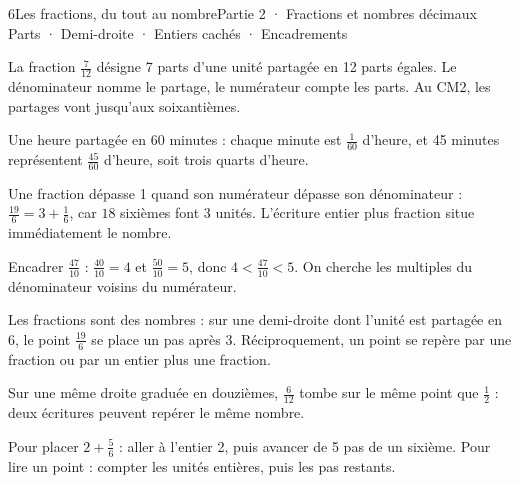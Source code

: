 \begin{ouverture}[calcul]{6}{Les fractions, du tout au nombre}{Partie 2 · Fractions et nombres décimaux}
{Parts · Demi-droite · Entiers cachés · Encadrements}
\end{ouverture}
\pagestyle{otMain}\essentiel\fontsize{11}{15}\selectfont
{}\label{cours-6-1}
\begin{definition}La fraction $\frac{7}{12}$ désigne 7 parts d’une unité partagée en 12 parts égales. Le dénominateur nomme le partage, le numérateur compte les parts. Au CM2, les partages vont jusqu’aux soixantièmes.\end{definition}
\begin{exemple}Une heure partagée en 60 minutes : chaque minute est $\frac1{60}$ d’heure, et 45 minutes représentent $\frac{45}{60}$ d’heure, soit trois quarts d’heure.\end{exemple}
\begin{propriete}Une fraction dépasse 1 quand son numérateur dépasse son dénominateur : $\frac{19}6=3+\frac16$, car $18$ sixièmes font 3 unités. L’écriture entier plus fraction situe immédiatement le nombre.\end{propriete}
\begin{savoirfaire}Encadrer $\frac{47}{10}$ : $\frac{40}{10}=4$ et $\frac{50}{10}=5$, donc $4<\frac{47}{10}<5$. On cherche les multiples du dénominateur voisins du numérateur.\end{savoirfaire}
\clearpage
{}\label{cours-6-2}
\begin{propriete}Les fractions sont des nombres : sur une demi-droite dont l’unité est partagée en 6, le point $\frac{19}6$ se place un pas après 3. Réciproquement, un point se repère par une fraction ou par un entier plus une fraction.\end{propriete}
\label{fig-cours-6-2-cours-droite-sixiemes}

\begin{exemple}Sur une même droite graduée en douzièmes, $\frac6{12}$ tombe sur le même point que $\frac12$ : deux écritures peuvent repérer le même nombre.\end{exemple}
\begin{savoirfaire}Pour placer $2+\frac56$ : aller à l’entier 2, puis avancer de 5 pas de un sixième. Pour lire un point : compter les unités entières, puis les pas restants.\end{savoirfaire}

